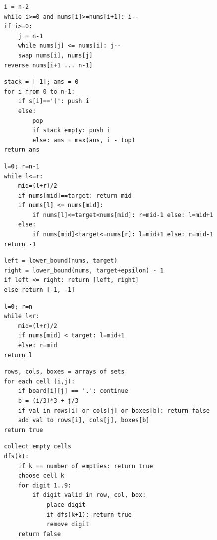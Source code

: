 \documentclass[11pt,a4paper]{ctexart}
\begin{document}
\begin{verbatim}
i = n-2
while i>=0 and nums[i]>=nums[i+1]: i--
if i>=0:
    j = n-1
    while nums[j] <= nums[i]: j--
    swap nums[i], nums[j]
reverse nums[i+1 ... n-1]
\end{verbatim}

\begin{verbatim}
stack = [-1]; ans = 0
for i from 0 to n-1:
    if s[i]=='(': push i
    else:
        pop
        if stack empty: push i
        else: ans = max(ans, i - top)
return ans
\end{verbatim}

\begin{verbatim}
l=0; r=n-1
while l<=r:
    mid=(l+r)/2
    if nums[mid]==target: return mid
    if nums[l] <= nums[mid]:
        if nums[l]<=target<nums[mid]: r=mid-1 else: l=mid+1
    else:
        if nums[mid]<target<=nums[r]: l=mid+1 else: r=mid-1
return -1
\end{verbatim}

\begin{verbatim}
left = lower_bound(nums, target)
right = lower_bound(nums, target+epsilon) - 1
if left <= right: return [left, right]
else return [-1, -1]
\end{verbatim}

\begin{verbatim}
l=0; r=n
while l<r:
    mid=(l+r)/2
    if nums[mid] < target: l=mid+1
    else: r=mid
return l
\end{verbatim}

\begin{verbatim}
rows, cols, boxes = arrays of sets
for each cell (i,j):
    if board[i][j] == '.': continue
    b = (i/3)*3 + j/3
    if val in rows[i] or cols[j] or boxes[b]: return false
    add val to rows[i], cols[j], boxes[b]
return true
\end{verbatim}

\begin{verbatim}
collect empty cells
dfs(k):
    if k == number of empties: return true
    choose cell k
    for digit 1..9:
        if digit valid in row, col, box:
            place digit
            if dfs(k+1): return true
            remove digit
    return false
\end{verbatim}
\end{document}
